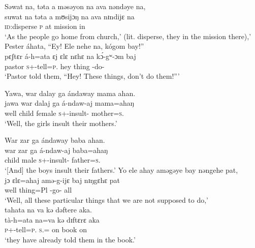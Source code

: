 \ea Səwat  na,   təta  a  məsəyon  na  ava  nəndəye  na,\\  
 \gll suwat  na təta  a  mʊsijɔŋ   na   ava  nɪndijɛ  na\\
 \textsc{id}:disperse  {\PSP}  \textsc{p}      at   mission  {\PSP}  in  {\DEM}  {\PSP}  \\
 \glt ‘As the people go home from church,’ (lit. disperse, they in the mission there),’ \\
 
 \medskip
 Pester  áhata,  “Ey!  Ele  nehe  na,  kógom  bay!”  \\
\gll pɛʃtɛr  á-h=ata   ɛj     ɛlɛ      nɛhɛ   na k\'ɔ-gʷ-ɔm baj\\
 pastor  \textsc{s}+{\IFV}-tell=\textsc{p}.{\IO}  hey  thing  {\DEM}  {\PSP} {\IFV}-do-{\twoP}  {\NEG}\\
 \glt ‘Pastor told them, “Hey! These things, don’t do them!”’
 \z

\ea Yawa,  war  dalay  ga ándaway  mama  ahan.\\
 \gll jawa   war   dalaj  ga  á-ndaw-aj   mama=ahaŋ\\
 well    child  female  {\ADJ}  \textsc{s}+{\IFV}-insult{}-{\CL}  mother=\textsc{s}.{\POSS}\\
 \glt ‘Well, the girls insult their mothers.’ 
 \z

\ea War  zar  ga  ándaway  baba  ahan.\\
 \gll war     zar  ga  á-ndaw-aj   baba=ahaŋ\\
 child  male  {\ADJ}  \textsc{s}+{\IFV}-insult{}-{\CL}  father=\textsc{s}.{\POSS}\\
 \glt ‘[And] the boys insult their fathers.’ 
 \z
\clearpage
\ea Yo  ele  ahay  aməgəye  bay  nəngehe    pat,\\
 \gll jɔ      ɛlɛ=ahaj  amə-g-ijɛ   baj      nɪŋgɛhɛ    pat\\
 well   thing=Pl      {\DEP}-go-{\CL}    {\NEG}    {\DEM}     all\\
 \glt ‘Well, all these particular things that we are not supposed to do,’\\
 
 \medskip
  tahata  na  va  kə  dəftere  aka.\\
 \gll tà-h=ata     na=va   kə   dɪftɛrɛ  aka\\
 \textsc{p}+{\PFV}-tell=\textsc{p}.{\IO}   \textsc{s}.{\DO}={\PRF}  on  book  on\\
 \glt ‘they have already told them in the book.’
 \z

